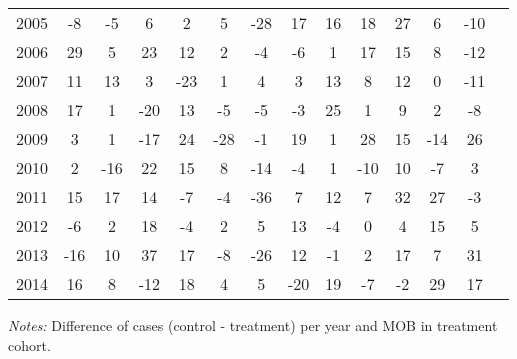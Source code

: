 \begin{table}[H]
\begin{threeparttable}
{\begin{tabular}{l*{13}{c}}
2005        &          -8&          -5&           6&           2&           5&         -28&          17&          16&          18&          27&           6&         -10\\
2006        &          29&           5&          23&          12&           2&          -4&          -6&           1&          17&          15&           8&         -12\\
2007        &          11&          13&           3&         -23&           1&           4&           3&          13&           8&          12&           0&         -11\\
2008        &          17&           1&         -20&          13&          -5&          -5&          -3&          25&           1&           9&           2&          -8\\
2009        &           3&           1&         -17&          24&         -28&          -1&          19&           1&          28&          15&         -14&          26\\
2010        &           2&         -16&          22&          15&           8&         -14&          -4&           1&         -10&          10&          -7&           3\\
2011        &          15&          17&          14&          -7&          -4&         -36&           7&          12&           7&          32&          27&          -3\\
2012        &          -6&           2&          18&          -4&           2&           5&          13&          -4&           0&           4&          15&           5\\
2013        &         -16&          10&          37&          17&          -8&         -26&          12&          -1&           2&          17&           7&          31\\
2014        &          16&           8&         -12&          18&           4&           5&         -20&          19&          -7&          -2&          29&          17\\
 \bottomrule \end{tabular} } \begin{tablenotes} \item \scriptsize \emph{Notes:} Difference of cases (control - treatment) per year and MOB in treatment cohort. \end{tablenotes} \end{threeparttable} \end{table} 
